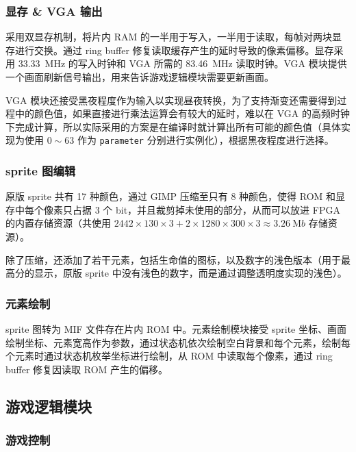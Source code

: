 \documentclass[UTF8, 11pt, fontset=none]{ctexart}
\begin{document}
\subsubsection{显存 \& VGA 输出}

采用双显存机制，将片内 RAM 的一半用于写入，一半用于读取，每帧对两块显存进行交换。通过 ring buffer 修复读取缓存产生的延时导致的像素偏移。显存采用 \SI{33.33}{\mega\hertz} 的写入时钟和 VGA 所需的 \SI{83.46}{\mega\hertz} 读取时钟。VGA 模块提供一个画面刷新信号输出，用来告诉游戏逻辑模块需要更新画面。

VGA 模块还接受黑夜程度作为输入以实现昼夜转换，为了支持渐变还需要得到过程中的颜色值，如果直接进行乘法运算会有较大的延时，难以在 VGA 的高频时钟下完成计算，所以实际采用的方案是在编译时就计算出所有可能的颜色值（具体实现为使用 $0 \sim 63$ 作为 \texttt{parameter} 分别进行实例化），根据黑夜程度进行选择。

\subsubsection{sprite 图编辑}

原版 sprite 共有 17 种颜色，通过 GIMP 压缩至只有 8 种颜色，使得 ROM 和显存中每个像素只占据 3 个 bit，并且裁剪掉未使用的部分，从而可以放进 FPGA 的内置存储资源（共使用 $2442 \times 130 \times 3 + 2 \times 1280 \times 300 \times 3 \approx \SI{3.26}{\mega b}$ 存储资源）。

除了压缩，还添加了若干元素，包括生命值的图标，以及数字的浅色版本（用于最高分的显示，原版 sprite 中没有浅色的数字，而是通过调整透明度实现的浅色）。

\subsubsection{元素绘制}

sprite 图转为 MIF 文件存在片内 ROM 中。元素绘制模块接受 sprite 坐标、画面绘制坐标、元素宽高作为参数，通过状态机依次绘制空白背景和每个元素，绘制每个元素时通过状态机枚举坐标进行绘制，从 ROM 中读取每个像素，通过 ring buffer 修复因读取 ROM 产生的偏移。

\subsection{游戏逻辑模块}

\subsubsection{游戏控制}
\end{document}
